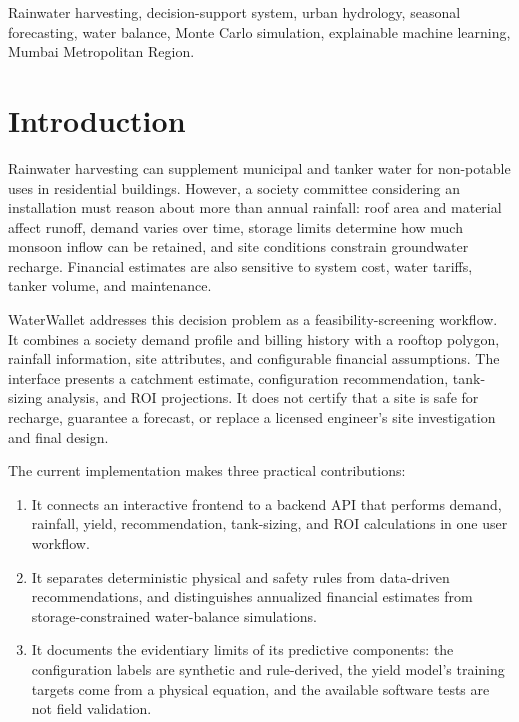 \documentclass[conference]{IEEEtran}
\begin{document}
\begin{IEEEkeywords}
Rainwater harvesting, decision-support system, urban hydrology,
seasonal forecasting, water balance, Monte Carlo simulation,
explainable machine learning, Mumbai Metropolitan Region.
\end{IEEEkeywords}

\section{Introduction}
\label{sec:intro}

Rainwater harvesting can supplement municipal and tanker water for
non-potable uses in residential buildings. However, a society committee
considering an installation must reason about more than annual rainfall:
roof area and material affect runoff, demand varies over time, storage
limits determine how much monsoon inflow can be retained, and site
conditions constrain groundwater recharge. Financial estimates are also
sensitive to system cost, water tariffs, tanker volume, and maintenance.

WaterWallet addresses this decision problem as a feasibility-screening
workflow. It combines a society demand profile and billing history with a
rooftop polygon, rainfall information, site attributes, and configurable
financial assumptions. The interface presents a catchment estimate,
configuration recommendation, tank-sizing analysis, and ROI projections.
It does not certify that a site is safe for recharge, guarantee a forecast,
or replace a licensed engineer's site investigation and final design.

The current implementation makes three practical contributions:
\begin{enumerate}
  \item It connects an interactive frontend to a backend API that performs
    demand, rainfall, yield, recommendation, tank-sizing, and ROI
    calculations in one user workflow.
  \item It separates deterministic physical and safety rules from
    data-driven recommendations, and distinguishes annualized financial
    estimates from storage-constrained water-balance simulations.
  \item It documents the evidentiary limits of its predictive components:
    the configuration labels are synthetic and rule-derived, the yield
    model's training targets come from a physical equation, and the
    available software tests are not field validation.
\end{enumerate}
\end{document}
